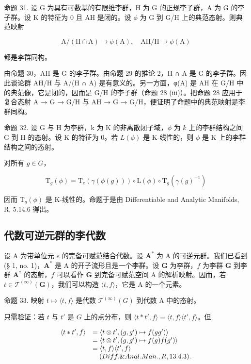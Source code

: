 命题 31. 设 G 为具有可数基的有限维李群，H 为 G 的正规李子群，A 为 G 的李子群。设 K 的特征为 0 且 AH 是闭的。设 \(\phi\) 为 G 到 G/H 上的典范态射。则典范映射

\[
\mathrm{A} / (\mathrm{H} \cap \mathrm{A}) \rightarrow \phi (\mathrm{A}), \quad \mathrm{AH} / \mathrm{H} \rightarrow \phi (\mathrm{A})
\]

都是李群同构。

由命题 30，AH 是 G 的李子群。由命题 29 的推论 2，H ∩ A 是 G 的李子群。因此谈论群 AH/H 与 A/(H ∩ A) 是有意义的。另一方面，φ(A) 是 AH 在 G/H 中的典范像，它是闭的，因而是 G/H 的李子群（命题 28 (iii)）。把命题 28 应用于复合态射 A → G → G/H 与 AH → G → G/H，便证明了命题中的典范映射是李群同构。

命题 32. 设 G 与 H 为李群，k 为 K 的非离散闭子域，\(\phi\) 为 \(k\) 上的李群结构之间 G 到 H 的态射。设 K 的特征为 0。若 \(L(\phi)\) 是 K-线性的，则 \(\phi\) 是 K 上的李群结构之间的态射。

对所有 \(g \in G\)，

\[
\mathrm{T} _ {g} (\phi) = \mathrm{T} _ {e} (\gamma (\phi (g))) \circ \mathrm{L} (\phi) \circ \mathrm{T} _ {g} (\gamma (g) ^ {- 1})
\]

因而 \(\mathrm{T}_g(\phi)\) 是 K-线性的。命题于是由 Differentiable and Analytic Manifolds, R, 5.14.6 得出。

\subsection{代数可逆元群的李代数}

设 A 为带单位元 \(e\) 的完备可赋范结合代数。设 \(\mathbf{A}^*\) 为 A 的可逆元群。我们已看到 (§ 1, no. 1)，\(\mathbf{A}^*\) 是 A 的开子流形且是一个李群。设 \(\mathbf{G}\) 为李群，\(f\) 为李群 \(\mathbf{G}\) 到李群 \(\mathbf{A}^*\) 的态射，\(f\) 可以看作 \(\mathbf{G}\) 到完备可赋范空间 A 的解析映射。因而，若 \(t \in \mathcal{T}^{(\infty)}(\mathbf{G})\)，我们可以构造 \(\langle t, f \rangle\)，它是 A 的一个元素。

命题 33. 映射 \(t \mapsto \langle t, f \rangle\) 是代数 \(\mathcal{T}^{(\infty)}(G)\) 到代数 A 中的态射。

只需验证：若 \(t\) 与 \(t'\) 是 \(G\) 上的点分布，则 \(\langle t * t', f \rangle = \langle t, f \rangle \langle t', f \rangle\)。但

\[
\begin{array}{r l} \langle t * t ^ {\prime}, f \rangle & = \langle t \otimes t ^ {\prime}, (g, g ^ {\prime}) \mapsto f (g g ^ {\prime}) \rangle \\ & = \langle t \otimes t ^ {\prime}, (g, g ^ {\prime}) \mapsto f (g) f (g ^ {\prime}) \rangle \\ & = \langle t, f \rangle \langle t ^ {\prime}, f \rangle \\ & \quad (Diff. \& Anal. Man., R, 13.4.3). \end{array}
\]


